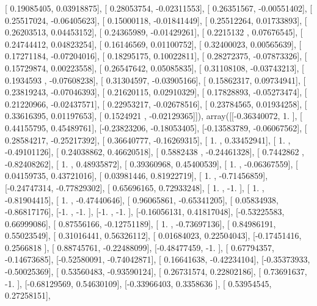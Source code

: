 \documentclass{article}
\begin{document}
       [ 0.19085405,  0.03918875],
       [ 0.28053754, -0.02311553],
       [ 0.26351567, -0.00551402],
       [ 0.25517024, -0.06405623],
       [ 0.15000118, -0.01841449],
       [ 0.25512264,  0.01733893],
       [ 0.26203513,  0.04453152],
       [ 0.24365989, -0.01429261],
       [ 0.2215132 ,  0.07676545],
       [ 0.24744412,  0.04823254],
       [ 0.16146569,  0.01100752],
       [ 0.32400023,  0.00565639],
       [ 0.17271184, -0.07204016],
       [ 0.18295175,  0.10022811],
       [ 0.28272375, -0.07873326],
       [ 0.15729874,  0.00223558],
       [ 0.26547642,  0.05085835],
       [ 0.31108108, -0.03743213],
       [ 0.1934593 , -0.07608238],
       [ 0.31304597, -0.03905166],
       [ 0.15862317,  0.09734941],
       [ 0.23819243, -0.07046393],
       [ 0.21620115,  0.02910329],
       [ 0.17828893, -0.05273474],
       [ 0.21220966, -0.02437571],
       [ 0.22953217, -0.02678516],
       [ 0.23784565,  0.01934258],
       [ 0.33616395,  0.01197653],
       [ 0.1524921 , -0.02129365]]), array([[-0.36340072,  1.        ],
       [ 0.44155795,  0.45489761],
       [-0.23823206, -0.18053405],
       [-0.13583789, -0.06067562],
       [ 0.28584217, -0.25217392],
       [ 0.36640777, -0.16269315],
       [ 1.        ,  0.33452941],
       [ 1.        , -0.49101126],
       [ 0.24038862,  0.46620518],
       [ 0.5882438 , -0.24461328],
       [ 0.7442862 , -0.82408262],
       [ 1.        ,  0.48935872],
       [ 0.39360968,  0.45400539],
       [ 1.        , -0.06367559],
       [ 0.04159735,  0.43721016],
       [ 0.03981446,  0.81922719],
       [ 1.        , -0.71456859],
       [-0.24747314, -0.77829302],
       [ 0.65696165,  0.72933248],
       [ 1.        , -1.        ],
       [ 1.        , -0.81904415],
       [ 1.        , -0.47440646],
       [ 0.96065861, -0.65341205],
       [ 0.05834938, -0.86817176],
       [-1.        , -1.        ],
       [-1.        , -1.        ],
       [-0.16056131,  0.41817048],
       [-0.53225583,  0.66999086],
       [ 0.87556166, -0.12751189],
       [ 1.        , -0.73697136],
       [ 0.84986191,  0.55023549],
       [ 0.31016441,  0.56326112],
       [ 0.01684023,  0.22504043],
       [-0.17451416,  0.2566818 ],
       [ 0.88745761, -0.22488099],
       [-0.48477459, -1.        ],
       [ 0.67794357, -0.14673685],
       [-0.52580091, -0.74042871],
       [ 0.16641638, -0.42234104],
       [-0.35373933, -0.50025369],
       [ 0.53560483, -0.93590124],
       [ 0.26731574,  0.22802186],
       [ 0.73691637, -1.        ],
       [-0.68129569,  0.54630109],
       [-0.33966403,  0.3358636 ],
       [ 0.53954545,  0.27258151],
\end{document}
